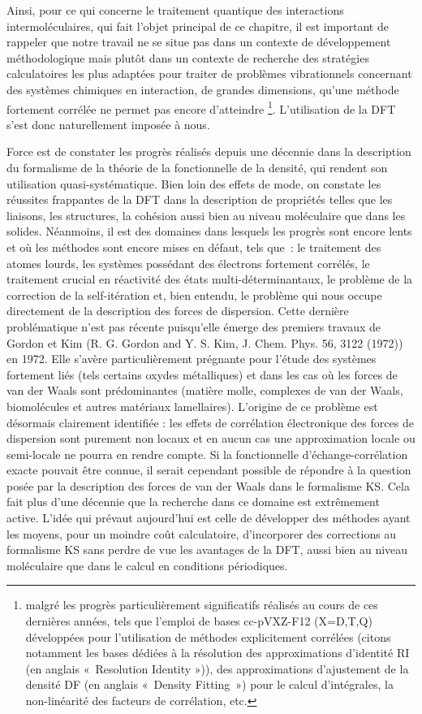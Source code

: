 	Ainsi, pour ce qui concerne le traitement quantique des interactions intermoléculaires, qui fait l’objet principal de ce chapitre, il est important de rappeler que notre travail ne se situe pas dans un contexte de développement méthodologique mais plutôt dans un contexte de recherche des stratégies calculatoires les plus adaptées pour traiter de problèmes vibrationnels concernant des systèmes chimiques en interaction, de grandes dimensions, qu’une méthode fortement corrélée ne permet pas encore d’atteindre \footnote{malgré les progrès particulièrement significatifs réalisés au cours de ces dernières années, tels que l’emploi de bases cc-pVXZ-F12 (X=D,T,Q) développées pour l’utilisation de méthodes explicitement corrélées (citons notamment les bases dédiées à la résolution des approximations d'identité RI (en anglais « Resolution Identity »)), des approximations d'ajustement de la densité DF (en anglais « Density Fitting ») pour le calcul d’intégrales, la non-linéarité des facteurs de corrélation, etc.}. L’utilisation de la DFT s’est donc naturellement imposée à nous.
	
	Force est de constater les progrès réalisés depuis une décennie dans la description du formalisme de la théorie de la fonctionnelle de la densité, qui rendent son utilisation quasi-systématique. Bien loin des effets de mode, on constate les réussites frappantes de la DFT dans la description de propriétés telles que les liaisons, les structures, la cohésion aussi bien au niveau moléculaire que dans les solides. Néanmoins, il est des domaines dans lesquels les progrès sont encore lents et où les méthodes sont encore mises en défaut, tels que : le traitement des atomes lourds, les systèmes possédant des électrons fortement corrélés, le traitement crucial en réactivité des états multi-déterminantaux, le problème de la correction de la self-itération et, bien entendu, le problème qui nous occupe directement de la description des forces de dispersion. Cette dernière problématique n’est pas récente puisqu'elle émerge des premiers travaux de Gordon et Kim (R. G. Gordon and Y. S. Kim, J. Chem. Phys. 56, 3122 (1972)) en 1972. Elle s’avère particulièrement prégnante pour l’étude des systèmes fortement liés (tels certains oxydes métalliques) et dans les cas où les forces de van der Waals sont prédominantes (matière molle, complexes de van der Waals, biomolécules et autres matériaux lamellaires). L’origine de ce problème est désormais clairement identifiée : les effets de corrélation électronique des forces de dispersion sont purement non locaux et en aucun cas une approximation locale ou semi-locale ne pourra en rendre compte. Si la fonctionnelle d’échange-corrélation exacte pouvait être connue, il serait cependant possible de répondre à la question posée par la description des forces de van der Waals dans le formalisme KS. Cela fait plus d’une décennie que la recherche dans ce domaine est extrêmement active. L’idée qui prévaut aujourd’hui est celle de développer des méthodes ayant les moyens, pour un moindre coût calculatoire, d’incorporer des corrections au formalisme KS sans perdre de vue les avantages de la DFT, aussi bien au niveau moléculaire que dans le calcul en conditions périodiques. 
	
